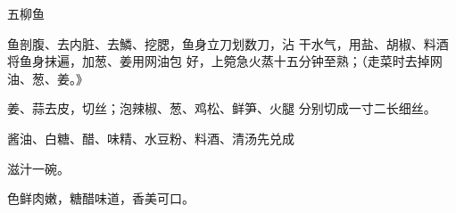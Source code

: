 \begin{recipe}{五柳鱼}

\ingredients


\cooking

\step 鱼剖腹、去内脏、去鱗、挖腮，鱼身立刀划数刀，沾 干水气，用盐、胡椒、料酒将鱼身抹遍，加葱、姜用网油包 好，上箢急火蒸十五分钟至熟；（走菜时去掉网油、葱、姜。》

\step 姜、蒜去皮，切丝；泡辣椒、葱、鸡松、鲜笋、火腿 分别切成一寸二长细丝。

\step 酱油、白糖、醋、味精、水豆粉、料酒、清汤先兑成

滋汁一碗。

\notes

色鲜肉嫩，糖醋味道，香美可口。

\end{recipe}

